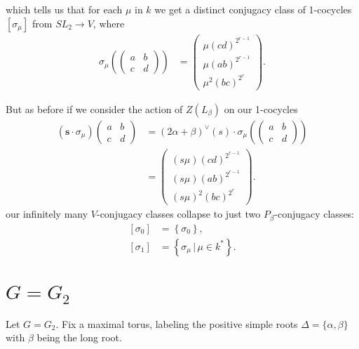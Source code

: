 which tells us that for each $\mu$ in $k$ we get a distinct conjugacy class of 1-cocycles $[\sigma_\mu]$ from $SL_2 \rightarrow V$, where
\begin{align*}
\sigma_\mu\left(\left(\begin{matrix} a & b \\ c & d \end{matrix}\right)\right) &=
\left(\begin{matrix}  \mu(cd)^{2^{r-1}}  \\ \mu\left(ab \right)^{2^{r-1}} \\ \mu^2\left( bc \right)^{2^r} \end{matrix}\right).
\end{align*}

But as before if we consider the action of $Z(L_\beta)$ on our 1-cocycles
\begin{align*}
(\mathbf{s}\cdot \sigma_\mu)\left(\begin{matrix} a & b \\ c & d \end{matrix}\right) &=
(2\alpha + \beta)^\vee(s) \cdot \sigma_\mu\left(\left(\begin{matrix} a & b \\ c & d \end{matrix}\right)\right)\\
&=
\left(\begin{matrix}  (s\mu)(cd)^{2^{r-1}}  \\ (s\mu)\left(ab \right)^{2^{r-1}} \\ (s\mu)^2\left( bc \right)^{2^r} \end{matrix}\right).
\end{align*}
our infinitely many $V$-conjugacy classes collapse to just two $P_\beta$-conjugacy classes:
\begin{align*}
\left[\sigma_0\right] &= \left\{ \sigma_0 \right\}, \\
\left[\sigma_1\right] &= \left\{ \sigma_\mu \, | \, \mu \in k^* \right\}.
\end{align*}

	\section{$G = G_2$}
	\label{g2}

	Let $G=G_2$. Fix a maximal torus, labeling the positive simple roots $\Delta=\{\alpha, \beta\}$ with $\beta$ being the long root. 

